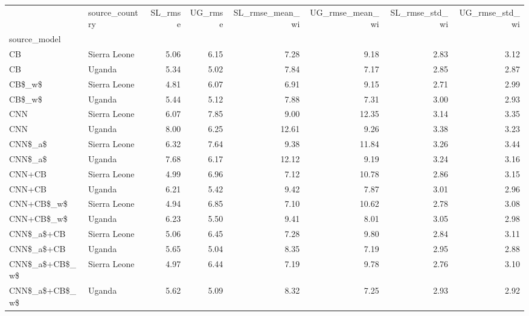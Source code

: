 \begin{tabular}{llrrrrrr}
\toprule
{} & source\_country &  SL\_rmse &  UG\_rmse &  SL\_rmse\_mean\_wi &  UG\_rmse\_mean\_wi &  SL\_rmse\_std\_wi &  UG\_rmse\_std\_wi \\
source\_model   &                &          &          &                  &                  &                 &                 \\
\midrule
CB             &   Sierra Leone &     5.06 &     6.15 &             7.28 &             9.18 &            2.83 &            3.12 \\
CB             &         Uganda &     5.34 &     5.02 &             7.84 &             7.17 &            2.85 &            2.87 \\
CB\$\_w\$         &   Sierra Leone &     4.81 &     6.07 &             6.91 &             9.15 &            2.71 &            2.99 \\
CB\$\_w\$         &         Uganda &     5.44 &     5.12 &             7.88 &             7.31 &            3.00 &            2.93 \\
CNN            &   Sierra Leone &     6.07 &     7.85 &             9.00 &            12.35 &            3.14 &            3.35 \\
CNN            &         Uganda &     8.00 &     6.25 &            12.61 &             9.26 &            3.38 &            3.23 \\
CNN\$\_a\$        &   Sierra Leone &     6.32 &     7.64 &             9.38 &            11.84 &            3.26 &            3.44 \\
CNN\$\_a\$        &         Uganda &     7.68 &     6.17 &            12.12 &             9.19 &            3.24 &            3.16 \\
CNN+CB         &   Sierra Leone &     4.99 &     6.96 &             7.12 &            10.78 &            2.86 &            3.15 \\
CNN+CB         &         Uganda &     6.21 &     5.42 &             9.42 &             7.87 &            3.01 &            2.96 \\
CNN+CB\$\_w\$     &   Sierra Leone &     4.94 &     6.85 &             7.10 &            10.62 &            2.78 &            3.08 \\
CNN+CB\$\_w\$     &         Uganda &     6.23 &     5.50 &             9.41 &             8.01 &            3.05 &            2.98 \\
CNN\$\_a\$+CB     &   Sierra Leone &     5.06 &     6.45 &             7.28 &             9.80 &            2.84 &            3.11 \\
CNN\$\_a\$+CB     &         Uganda &     5.65 &     5.04 &             8.35 &             7.19 &            2.95 &            2.88 \\
CNN\$\_a\$+CB\$\_w\$ &   Sierra Leone &     4.97 &     6.44 &             7.19 &             9.78 &            2.76 &            3.10 \\
CNN\$\_a\$+CB\$\_w\$ &         Uganda &     5.62 &     5.09 &             8.32 &             7.25 &            2.93 &            2.92 \\
\bottomrule
\end{tabular}
